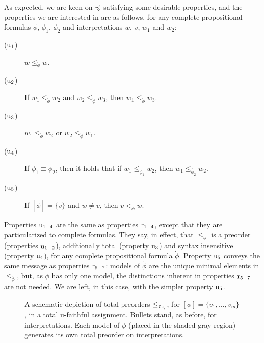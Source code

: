 As expected, we are keen on $\preccurlyeq$ satisfying some desirable properties,
and the properties we are interested in are as follows, 
for any complete propositional formulas $\dot{\phi}$, $\dot{\phi_{1}}$, $\dot{\phi_{2}}$
and interpretations $w$, $v$, $w_1$ and $w_2$:

\begin{description}
	\item[($\mathrm{u}_{1}$)] $w\le_{\dot{\phi}} w$.
	\item[($\mathrm{u}_{2}$)] If $w_1\le_{\dot{\phi}} w_2$ and $w_2\le_{\dot{\phi}} w_3$, 
		then $w_1\le_{\dot{\phi}} w_3$.
	\item[($\mathrm{u}_{3}$)] $w_1\le_{\dot{\phi}} w_2$ or $w_2\le_{\dot{\phi}} w_1$.
	\item[($\mathrm{u}_{4}$)] If $\dot{\phi_1}\equiv \dot{\phi_2}$, then it holds that if  $w_1\le_{\dot{\phi_1}}w_2$, then $w_1\le_{\dot{\phi_2}}w_2$. 
	\item[($\mathrm{u}_{5}$)] If $[\dot{\phi}]=\{v\}$ and $w\neq v$, then $v<_{\dot{\phi}} w$.
\end{description}

Properties $\mathrm{u}_{1-4}$ are the same as properties $\mathrm{r}_{1-4}$,
except that they are particularized to complete formulas. 
They say, in effect, that $\le_{\dot{\phi}}$ is a preorder (properties $\mathrm{u}_{1-2}$),
additionally total (property $\mathrm{u}_{3}$)
and syntax insensitive (property $\mathrm{u}_{4}$),
for any complete propositional formula $\dot{\phi}$.
Property $\mathrm{u}_{5}$ conveys the same message as properties $\mathrm{r}_{5-7}$:
models of $\dot{\phi}$ are the unique minimal elements in $\le_{\dot{\phi}}$,
but, as $\dot{\phi}$ has only one model,
the distinctions inherent in properties $\mathrm{r}_{5-7}$ are not needed.
We are left, in this case, with the simpler property $\mathrm{u}_{5}$.

\begin{figure}\centering
	\caption{
		A schematic depiction of total preorders $\le_{\varepsilon_{v_i}}$,
		for $[\phi]=\{v_1,\dots,v_m\}$,
		in a total u-faithful assignment. 
		Bullets stand, as before, for interpretations.
		Each model of $\phi$ (placed in the shaded gray region) 
		generates its own total preorder on interpretations.
	}
	\label{fig:3-update-ufaithful-schematic}
\end{figure}

